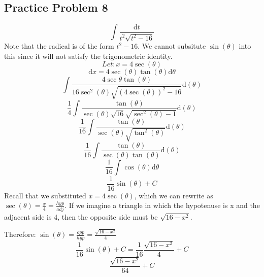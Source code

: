 \documentclass[letterpaper, 12pt]{article}
\newcommand*{\diff}{\mathrm{d}}
\begin{document}
\subsection*{Practice Problem 8}
\[ \int{\frac{\diff{t}}{t^{2}\sqrt{t^{2}-16}}} \]
Note that the radical is of the form \( t^{2}-16 \). We cannot subsitute
\( \sin(\theta) \) into this since it will not satisfy the trigonometric
identity.
\[ Let: x = 4\sec(\theta) \]
\[ \diff{x} = 4\sec(\theta)\tan(\theta)\diff{\theta} \]
\[ \int{\frac{4\sec{\theta}\tan(\theta)}
   {16\sec^{2}(\theta)\sqrt{(4\sec(\theta))^{2}-16}}\diff(\theta)} \]
\[ \frac{1}{4}\int{\frac{\tan(\theta)}
   {\sec(\theta)\sqrt{16}\sqrt{\sec^{2}(\theta)-1}}\diff(\theta)} \]
\[ \frac{1}{16}\int{\frac{\tan(\theta)}
   {\sec(\theta)\sqrt{\tan^{2}(\theta)}}\diff(\theta)} \]
\[ \frac{1}{16}\int{\frac{\tan(\theta)}
   {\sec(\theta)\tan(\theta)}\diff(\theta)} \]
\[ \frac{1}{16}\int{\cos(\theta)\diff{\theta}} \]
\[ \frac{1}{16}\sin(\theta)+C \]
Recall that we substituted \( x = 4\sec(\theta) \), which we can rewrite as
\( \sec(\theta) = \frac{x}{4} = \frac{hyp}{adj} \). If we imagine a triangle in
which the hypotenuse is x and the adjacent side is 4, then the opposite side
must be \( \sqrt{16-x^{2}} \).
\begin{center}
\end{center}
Therefore: \( \sin(\theta) = \frac{opp}{hyp} = \frac{\sqrt{16-x^{2}}}{4} \)
\[ \frac{1}{16}\sin(\theta)+C = \frac{1}{16}\frac{\sqrt{16-x^{2}}}{4}+C \]
\[ \frac{\sqrt{16-x^{2}}}{64}+C \]
\end{document}
